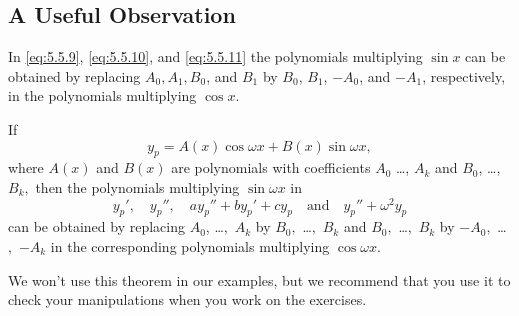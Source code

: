 \documentclass{ximera}
\begin{document}
 
\subsection*{A Useful Observation}
 
In \eqref{eq:5.5.9}, \eqref{eq:5.5.10}, and \eqref{eq:5.5.11} the polynomials
multiplying $\sin x$ can be obtained by replacing $A_0,A_1,B_0$,
and $B_1$ by $B_0$, $B_1$, $-A_0$, and $-A_1$, respectively, in the
polynomials multiplying $\cos x$. %
 
\begin{theorem}\label{thmtype:5.5.2}
If
$$
y_p=A(x)\cos\omega x+B(x)\sin\omega x,
$$
where $A(x)$ and $B(x)$ are polynomials with coefficients
$A_0$ \dots, $A_k$ and $B_0$, \dots, $B_k,$ then the polynomials
multiplying $\sin\omega x$ in
$$
y_p',\quad y_p'',\quad  ay_p''+by_p'+cy_p
\quad\mbox{and}\quad y_p''+\omega^2 y_p
$$
can be obtained by replacing $A_0$, \dots$,$ $A_k$ by $B_0,$ \dots$,$ $B_k$
and $B_0,$ \dots$,$  $B_k$ by $-A_0,$ \dots$,$ $-A_k$ in the corresponding
polynomials multiplying $\cos\omega x$.
\end{theorem}
 
We won't use this theorem in our examples, but we recommend that
you use it to check your manipulations when you work on the  exercises.
 
\end{document}
